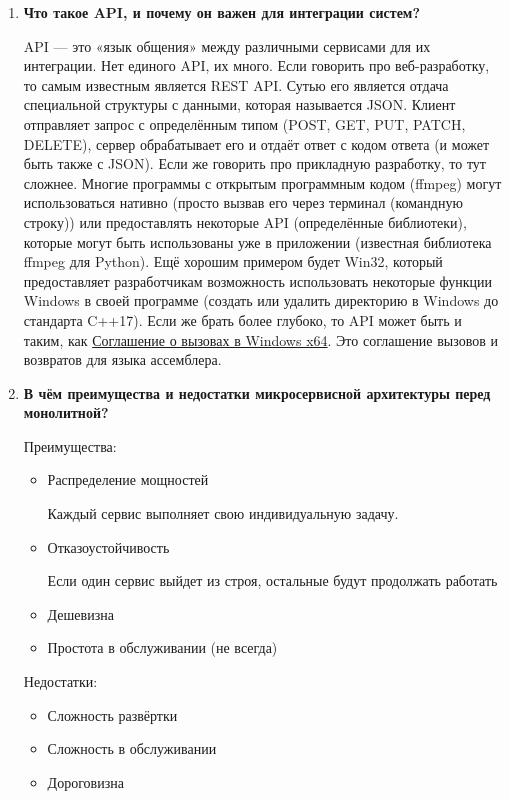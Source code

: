 \documentclass[a4paper, 14pt]{extarticle}
\begin{document}
\begin{enumerate}[label=\textbf{\arabic*.}, itemsep=1.5em, leftmargin=*]
  \item \textbf{Что такое API, и почему он важен для интеграции систем?}

    API --- это «язык общения» между различными сервисами для их
    интеграции. Нет единого API, их много. Если
    говорить про веб-разработку, то самым известным является REST API.
    Сутью его является отдача специальной структуры с данными,
    которая называется JSON. Клиент отправляет запрос с
    определённым типом (POST, GET, PUT, PATCH, DELETE), сервер
    обрабатывает его и отдаёт ответ с кодом ответа (и может быть
    также с JSON). Если же говорить про прикладную разработку, то тут
    сложнее. Многие программы с открытым программным кодом (ffmpeg)
    могут использоваться нативно (просто вызвав его через терминал
    (командную строку)) или предоставлять некоторые API (определённые
    библиотеки), которые могут быть использованы уже в приложении
    (известная библиотека ffmpeg для Python). Ещё хорошим
    примером будет Win32, который предоставляет разработчикам
    возможность использовать некоторые функции Windows в своей
    программе (создать или удалить директорию в Windows до стандарта
    C++17). Если же брать более глубоко, то API может быть и
    таким, как
    \href{https://learn.microsoft.com/en-en/cpp/build/x64-calling-convention?view=msvc-170}{Соглашение
      о
    вызовах в Windows x64}. Это соглашение вызовов и возвратов для
    языка ассемблера.

  \item \textbf{В чём преимущества и недостатки микросервисной
    архитектуры перед монолитной?}

    Преимущества:
    \begin{itemize}[label={---}, leftmargin=1.5em, itemsep=0.5em]
      \item Распределение мощностей

        Каждый сервис выполняет свою индивидуальную задачу.
      \item Отказоустойчивость

        Если один сервис выйдет из строя, остальные будут продолжать работать

      \item Дешевизна
      \item Простота в обслуживании (не всегда)
    \end{itemize}
    Недостатки:
    \begin{itemize}[label={---}, leftmargin=1.5em, itemsep=0.5em]
      \item Сложность развёртки
      \item Сложность в обслуживании
      \item Дороговизна
    \end{itemize}


\end{enumerate}
\end{document}
